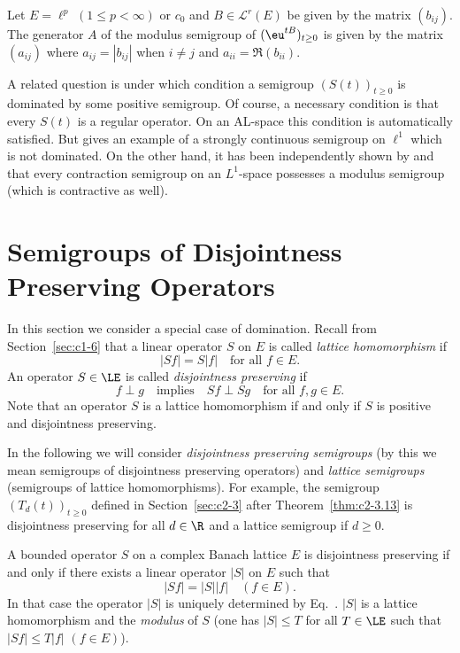 \begin{example}\label{ex:c2-4.19}
Let $E = \ell^{p}$ $(1 \leq p < \infty)$ or $c_{0}$ and $B \in \mathcal{L}^{r}(E)$ be
given by the matrix $(b_{ij})$.
The generator $A$ of the modulus semigroup of\/ $(\eu^{tB})_{t \geq 0}$ is given by the matrix $(a_{ij})$ where $a_{ij} = |b_{ij}|$ when $i \neq j$ and $a_{ii} = \Re(b_{ii})$.
\end{example}

A related question is under which condition a semigroup $(S(t))_{t \geq 0}$ is
dominated by some positive semigroup.
Of course, a necessary condition is that every $S(t)$ is a regular operator.
On an AL-space this condition is automatically satisfied.
But \textcite{kipnis:1974} gives an example of a strongly continuous semigroup on $\ell^{1}$ which is not dominated.
On the other hand, it has been independently shown by \textcite{kipnis:1974} and
\textcite{kubokawa:1975} that every contraction semigroup on an $L^{1}$-space
possesses a modulus semigroup (which is contractive as well).
\section{Semigroups of Disjointness Preserving Operators} \label{sec:c2-5}%
In this section we consider a special case of domination. 
Recall from Section~\ref{sec:c1-6} 
that a linear operator $S$ on $E$ is called \emph{lattice homomorphism} if
\begin{equation}\label{eq:c2-5.1}
|Sf| = S|f| \quad \text{for all } f \in E.
\end{equation}
An operator $S \in \LE$ is called \emph{disjointness preserving} if
\begin{equation}\label{eq:c2-5.2}
f \perp g \quad \text{implies} \quad Sf \perp Sg \quad \text{for all } f,g \in E.
\end{equation}
Note that an operator $S$ is a lattice homomorphism if and only if\/ $S$
is positive and disjointness preserving.

In the following we will consider \emph{disjointness preserving semigroups}
(by this we mean semigroups of disjointness preserving operators) and
\emph{lattice semigroups} (\ie semigroups of lattice homomorphisms). For
example, the semigroup $(T_{d}(t))_{t \geq 0}$ defined in Section~\ref{sec:c2-3} after Theorem~\ref{thm:c2-3.13}  is disjointness preserving for all $d \in \R$ and a lattice semigroup if\/ $d \geq 0$.

\begin{proposition}\label{prop:c2-5.1}
A bounded operator $S$ on a complex Banach lattice $E$ is disjointness preserving if and only if there exists a linear operator $|S|$ on $E$ such that
\begin{equation}\label{eq:c2-5.3}
|Sf| = |S||f| \quad (f \in E).
\end{equation}
In that case the operator $|S|$ is uniquely determined by Eq.~.
$|S|$ is a lattice homomorphism and the \emph{modulus} of\/ $S$ (\ie one has
$|S| \leq T$ for all $T \in \LE$ such that $|Sf| \leq T|f|$ $(f \in E)$).
\end{proposition}

